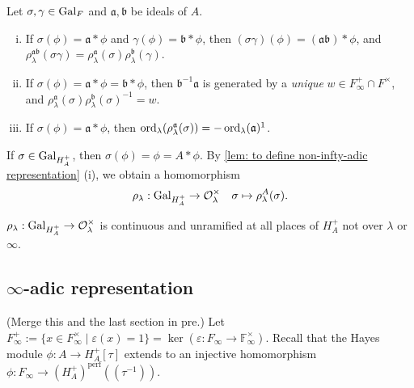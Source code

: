 \documentclass{article}
\newcommand{\F}{\mathbb{F}}
\newcommand{\perf}{\mathrm{perf}}
\renewcommand{\O}{\mathcal{O}}
\newcommand{\llpar}{(\!(}
\newcommand{\rrpar}{)\!)}
\begin{document}
\begin{lemma}\label{lem: to define non-infty-adic representation}
    Let $\sigma, \gamma\in\operatorname{Gal}_F$ and $\mathfrak{a}, \mathfrak{b}$ be ideals of $A$.
    \begin{enumerate}[(i)]
        \item If $\sigma(\phi) = \mathfrak{a}*\phi$ and $\gamma(\phi) = \mathfrak{b}*\phi$,
        then $(\sigma\gamma)(\phi) = (\mathfrak{a}\mathfrak{b}) * \phi$, and $\rho_{\lambda}^{\mathfrak{ab}}(\sigma\gamma) = \rho_\lambda^\mathfrak{a}(\sigma)\rho_\lambda^\mathfrak{b}(\gamma)$.
        \item If $\sigma(\phi) = \mathfrak{a}*\phi = \mathfrak{b}*\phi$, then $\mathfrak{b}^{-1}\mathfrak{a}$ is generated by a \textit{unique} $w\in F_\infty^+\cap F^\times$, and $\rho_\lambda^\mathfrak{a}(\sigma)\rho_\lambda^\mathfrak{b}(\sigma)^{-1} = w$.
        \item If $\sigma(\phi) = \mathfrak{a} * \phi$,
        then $\ord_\lambda(\rho_\lambda^\mathfrak{a}(\sigma)) = -\ord_\lambda(\mathfrak{a})\footnotemark$.
    \end{enumerate}
\end{lemma}

If $\sigma\in\operatorname{Gal}_{H_A^+}$,
then $\sigma(\phi) = \phi = A * \phi$.
By \cref{lem: to define non-infty-adic representation} (i),
we obtain a homomorphism
\[\rho_\lambda : \gal_{H_A^+}\to \O_\lambda^\times\quad \sigma\mapsto \rho_\lambda^A(\sigma).\]

\begin{lemma}\label{lem: non-infty-adic representation at narrow Hilbert class field is almost unramified}
    $\rho_\lambda : \gal_{H_A^+}\to\O_\lambda^\times$ is continuous and unramified at all places of $H_A^+$ not over $\lambda$ or $\infty$.
\end{lemma}


\subsection{\texorpdfstring{$\infty$}{infty}-adic representation}
(Merge this and the last section in pre.)
Let $F_\infty^+ := \{x\in F_\infty^\times\mid \varepsilon(x) = 1\} = \ker(\varepsilon : F_\infty\to \F_\infty^\times)$.
Recall that the Hayes module $\phi : A\to H_A^+[\tau]$ extends to an injective homomorphism $\phi : F_\infty\to \left( H_A^+ \right)^\perf\llpar\tau^{-1}\rrpar$.
\end{document}
